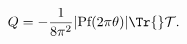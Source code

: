 \begin{equation}\label{eq:tc-uplus}
 Q=-\frac{1}{8\pi^2}|\text{Pf}(2\pi\theta)|\Tr{}\mathcal{T}.
\end{equation}

